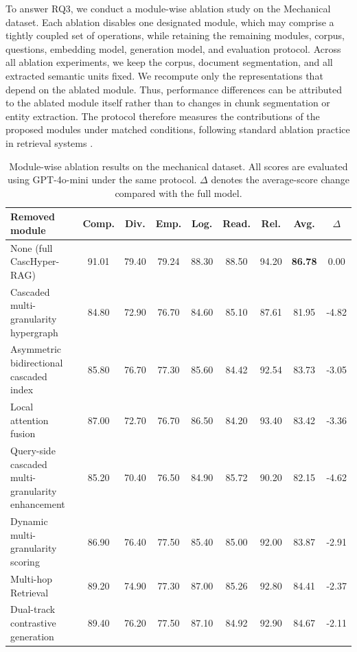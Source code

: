 \documentclass[a4paper,fleqn]{cas-dc}
\begin{document}
To answer RQ3, we conduct a module-wise ablation study on the Mechanical dataset. Each ablation disables one designated module, which may comprise a tightly coupled set of operations, while retaining the remaining modules, corpus, questions, embedding model, generation model, and evaluation protocol. Across all ablation experiments, we keep the corpus, document segmentation, and all extracted semantic units fixed. We recompute only the representations that depend on the ablated module. Thus, performance differences can be attributed to the ablated module itself rather than to changes in chunk segmentation or entity extraction. The protocol therefore measures the contributions of the proposed modules under matched conditions, following standard ablation practice in retrieval systems \citep{Santhanam2022ColBERTv2}.
\begin{table}[t]
\centering
\caption{Module-wise ablation results on the mechanical dataset. All scores are evaluated using GPT-4o-mini under the same protocol. $\Delta$ denotes the average-score change compared with the full model.}
\label{tab:ablation_results}
\setlength{\tabcolsep}{4pt}
\small
\begin{tabular}{lcccccccc}
\toprule
Removed module & Comp. & Div. & Emp. & Log. & Read. & Rel. & Avg. & $\Delta$ \\
\midrule
None (full CascHyper-RAG) & 91.01 & 79.40 & 79.24 & 88.30 & 88.50 & 94.20 & \textbf{86.78} & 0.00 \\
Cascaded multi-granularity hypergraph & 84.80 & 72.90 & 76.70 & 84.60 & 85.10 & 87.61 & 81.95 & -4.82 \\
Asymmetric bidirectional cascaded index & 85.80 & 76.70 & 77.30 & 85.60 & 84.42 & 92.54 & 83.73 & -3.05 \\
Local attention fusion & 87.00 & 72.70 & 76.70 & 86.50 & 84.20 & 93.40 & 83.42 & -3.36 \\
Query-side cascaded multi-granularity enhancement & 85.20 & 70.40 & 76.50 & 84.90 & 85.72 & 90.20 & 82.15 & -4.62 \\
Dynamic multi-granularity scoring & 86.90 & 76.40 & 77.50 & 85.40 & 85.00 & 92.00 & 83.87 & -2.91 \\
Multi-hop Retrieval & 89.20 & 74.90 & 77.30 & 87.00 & 85.26 & 92.80 & 84.41 & -2.37 \\
Dual-track contrastive generation & 89.40 & 76.20 & 77.50 & 87.10 & 84.92 & 92.90 & 84.67 & -2.11 \\
\bottomrule
\end{tabular}
\end{table}
\end{document}
